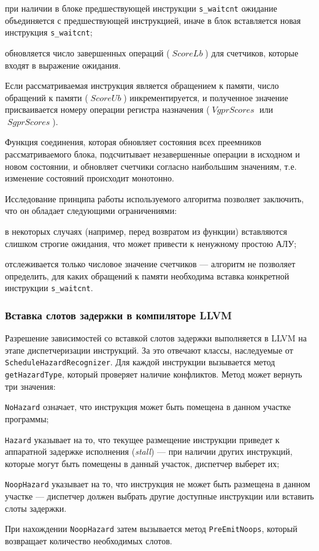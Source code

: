 \documentclass[a4paper,14pt]{extarticle}
\newcommand{\var}[1]{\mathop{\mathit{#1}}}
\begin{document}
{\begin{ol}
  \begin{ul}
  \item при наличии в блоке предшествующей инструкции \verb|s_waitcnt| ожидание объединяется
    с предшествующей инструкцией, иначе в блок вставляется новая инструкция \verb|s_waitcnt|;
  \item обновляется число завершенных операций ($\var{ScoreLb}$) для счетчиков,
    которые входят в выражение ожидания.
  \end{ul}
\item Если рассматриваемая инструкция является обращением к памяти,
  число обращений к памяти ($\var{ScoreUb}$) инкрементируется, и полученное значение
  присваивается номеру операции регистра назначения ($\var{VgprScores}$ или $\var{SgprScores}$).
\end{ol}

Функция соединения, которая обновляет состояния всех преемников рассматриваемого блока,
подсчитывает незавершенные операции в исходном и новом состоянии, и обновляет
счетчики согласно наибольшим значениям, т.е. изменение состояний происходит монотонно.

Исследование принципа работы используемого алгоритма позволяет заключить, что он обладает
следующими ограничениями:
\begin{ul}
\item в некоторых случаях (например, перед возвратом из функции) вставляются слишком
  строгие ожидания, что может привести к ненужному простою АЛУ;
\item отслеживается только числовое значение счетчиков — алгоритм не позволяет
  определить, для каких обращений к памяти необходима вставка конкретной
  инструкции \verb|s_waitcnt|.
\end{ul}

\subsubsection{Вставка слотов задержки в компиляторе LLVM}
\label{section:gcn-wait-states-llvm}

Разрешение зависимостей со вставкой слотов задержки выполняется в LLVM на этапе
диспетчеризации инструкций. За это отвечают классы, наследуемые от \verb|ScheduleHazardRecognizer|.
Для каждой инструкции вызывается метод \verb|getHazardType|, который проверяет наличие
конфликтов. Метод может вернуть три значения:
\begin{ol}
\item \verb|NoHazard| означает, что инструкция может быть помещена в данном участке программы;
\item \verb|Hazard| указывает на то, что текущее размещение инструкции приведет к аппаратной
  задержке исполнения (\textit{stall}) — при наличии других инструкций, которые
  могут быть помещены в данный участок, диспетчер выберет их;
\item \verb|NoopHazard| указывает на то, что инструкция не может быть размещена в данном
  участке — диспетчер должен выбрать другие доступные инструкции или вставить слоты задержки.
\end{ol}
При нахождении \verb|NoopHazard| затем вызывается метод \verb|PreEmitNoops|, который возвращает
количество необходимых слотов.

}
\end{document}
